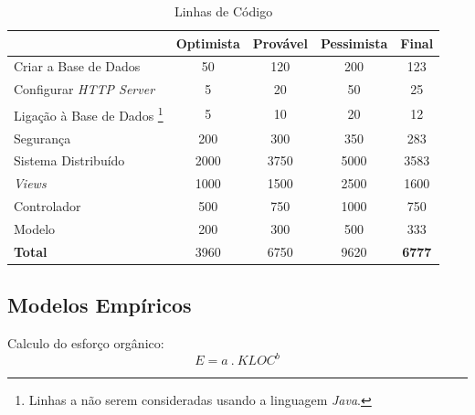 \documentclass[12pt, a4paper, twoside]{report} %
\begin{document}
\begin{savenotes}
\begin{table}[h]
\centering
\begin{tabular}{|l|c c c c|}
\hline
                       					& Optimista & Provável & Pessimista & \textbf{Final} \\ \hline
Criar a Base de Dados  					& 50        & 120      & 200        & 123   		 \\ \hline
Configurar \textit{HTTP Server} 		& 5         & 20       & 50         & 25    		 \\ \hline
Ligação à Base de Dados \footnote{Linhas a não serem consideradas usando a linguagem \textit{Java}.}
										& 5         & 10       & 20         & 12    		 \\ \hline
Segurança              					& 200       & 300      & 350        & 283   		 \\ \hline
Sistema Distribuído\footnotemark	    & 2000      & 3750     & 5000       & 3583   		 \\ \hline
\textit{Views}            				& 1000      & 1500     & 2500       & 1600  		 \\ \hline
Controlador                 			& 500       & 750      & 1000       & 750   		 \\ \hline
Modelo                      			& 200       & 300      & 500        & 333   		 \\ \hline
\textbf{Total}		   					& 3960      & 6750     & 9620       & \textbf{6777}  \\ \hline
\end{tabular}
\caption{Linhas de Código}
\label{codigo}
\end{table}%
\end{savenotes}



\subsection{Modelos Empíricos}

Calculo do esforço orgânico:
\\

\begin{equation}
E = a \ . \ KLOC ^ b
\end{equation}
\end{document}
